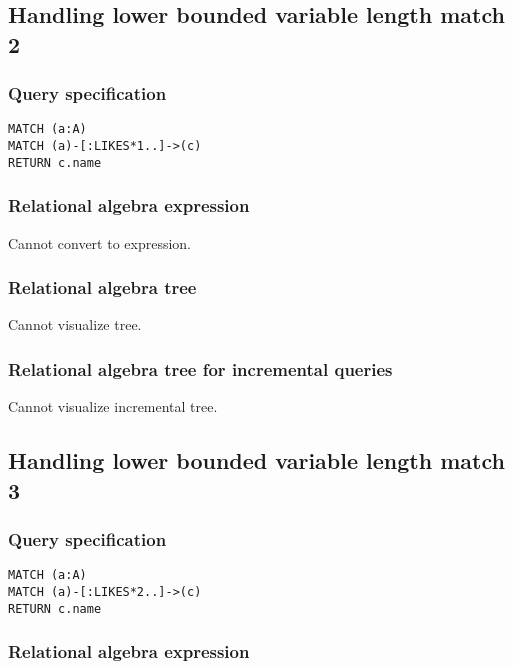 \subsection{Handling lower bounded variable length match 2}

\subsubsection*{Query specification}

\begin{lstlisting}
MATCH (a:A)
MATCH (a)-[:LIKES*1..]->(c)
RETURN c.name
\end{lstlisting}

\subsubsection*{Relational algebra expression}

Cannot convert to expression.

\subsubsection*{Relational algebra tree}

Cannot visualize tree.

\subsubsection*{Relational algebra tree for incremental queries}

Cannot visualize incremental tree.

\subsection{Handling lower bounded variable length match 3}

\subsubsection*{Query specification}

\begin{lstlisting}
MATCH (a:A)
MATCH (a)-[:LIKES*2..]->(c)
RETURN c.name
\end{lstlisting}

\subsubsection*{Relational algebra expression}

